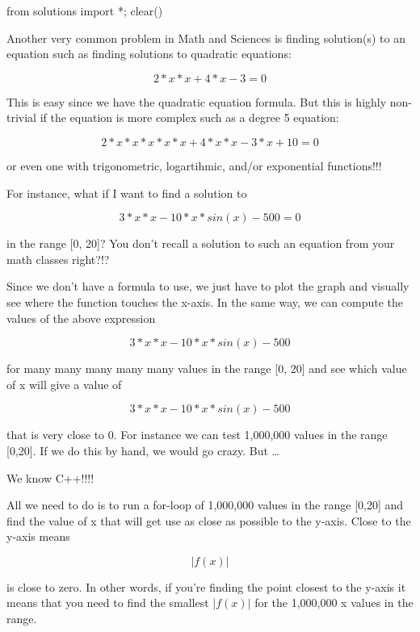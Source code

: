 \begin{python0}
from solutions import *; clear()
\end{python0}

Another very common problem in Math and Sciences is finding solution(s)
to an equation such as finding solutions to quadratic equations:

\[2 * x * x + 4 * x - 3 = 0\]

This is easy since we have the quadratic equation formula. But this is
highly non-trivial if the equation is more complex such as a degree 5
equation:

\[2 * x * x * x * x * x + 4 * x * x - 3 * x + 10 = 0\]

or even one with trigonometric, logartihmic, and/or exponential
functions!!!

For instance, what if I want to find a solution to

\[3 * x * x - 10 * x * sin(x) - 500 = 0\]

in the range [0, 20]? You don't recall a solution to
such an equation from your math classes right?!?

Since we don't have a formula to use, we just have to
plot the graph and visually see where the function touches the x-axis.
In the same way, we can compute the values of the above expression

\[3 * x * x - 10 * x * sin(x) - 500\]

for many many many many many values in the range [0, 20] and see
which value of x will give a value of

\[3 * x * x - 10 * x * sin(x) - 500\]

that is very close to 0. For instance we can test 1,000,000 values in
the range [0,20]. If we do this by hand, we would go crazy. But
\ldots

We know C++!!!!

All we need to do is to run a for-loop of 1,000,000 values in the range
[0,20] and find the value of x that will get use as close as
possible to the y-axis. Close to the y-axis means

\[|f(x)|\]

is close to zero. In other words, if you're finding the
point closest to the y-axis it means that you need to find the smallest
$|f(x)|$ for the 1,000,000 x values in the range.

